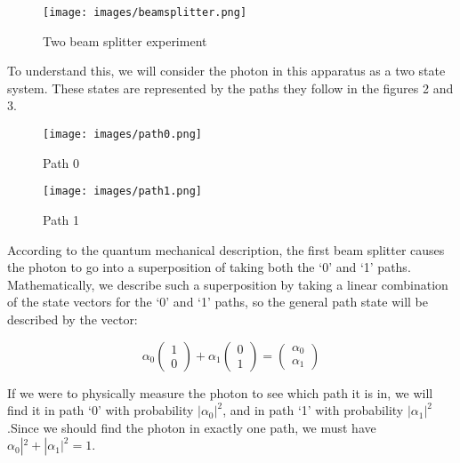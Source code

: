 \documentclass[12pt]{article}
\begin{document}
\begin{figure}[htp]
    \centering
    \texttt{[image: images/beamsplitter.png]}
    \caption{Two beam splitter experiment}
\end{figure}

To understand this, we will consider the photon in this apparatus as a two state system. These states are represented by the paths they follow in the figures 2 and 3.

\begin{figure}[h]
    \centering
    \begin{minipage}{0.45\textwidth} %
        \centering
        \texttt{[image: images/path0.png]} %
        \caption{Path 0}
    \end{minipage}
    \hfill %
    \begin{minipage}{0.45\textwidth} %
        \centering
        \texttt{[image: images/path1.png]} %
        \caption{Path 1}
    \end{minipage}
\end{figure}

According to the quantum mechanical description, the first beam splitter causes the photon to go into a superposition of taking both the ‘0’ and ‘1’ paths. Mathematically, we describe such a superposition by taking a linear combination of the state vectors for the ‘0’ and ‘1’ paths, so the general path state will be described by the vector:

\begin{equation}
    \alpha_0 \begin{pmatrix} 1 \\ 0 \end{pmatrix} + 
    \alpha_1 \begin{pmatrix} 0 \\ 1 \end{pmatrix} =
    \begin{pmatrix} \alpha_0 \\ \alpha_1 \end{pmatrix}
\end{equation}

If we were to physically measure the photon to see which path it is in, we will find
it in path ‘0’ with probability \( |\alpha_0|^2 \), and in path ‘1’ with probability \( |\alpha_1|^2 \).Since we should find the photon in exactly one path, we must have \(\alpha_0|^2 + |\alpha_1|^2 = 1\).
\end{document}
